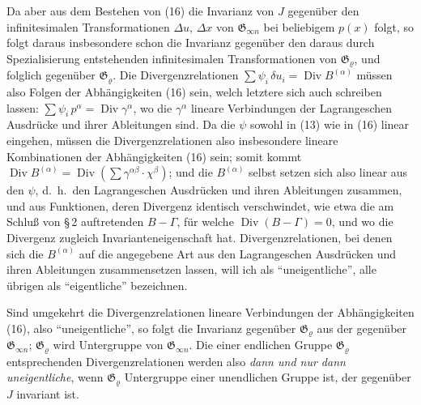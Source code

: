 \documentclass[12pt,a4paper]{article}
\begin{document}
Da aber aus dem Bestehen von (16) die Invarianz von $J$ gegen\"uber den infinitesimalen Transformationen $\Delta u$, $\Delta x$ von $\mathfrak{G}_{\infty n}$ bei beliebigem $p(x)$ folgt, so folgt daraus insbesondere schon die Invarianz gegen\"uber den daraus durch Spezialisierung entstehenden infinitesimalen Transformationen von $\mathfrak{G}_{\varrho}$, und folglich gegen\"uber $\mathfrak{G}_{\varrho}$. Die Divergenzrelationen $\sum\psi_{i}\,\delta u_{i}=\operatorname{Div}B^{(\alpha)}$ m\"ussen also Folgen der Abh\"angigkeiten (16) sein, welch letztere sich auch schreiben lassen: $\sum\psi_{i}\,p^{\alpha}=\operatorname{Div}\gamma^{\alpha}$, wo die $\gamma^{\alpha}$ lineare Verbindungen der Lagrangeschen Ausdr\"ucke und ihrer Ableitungen sind. Da die $\psi$ sowohl in (13) wie in (16) linear eingehen, m\"ussen die Divergenzrelationen also insbesondere lineare Kombinationen der Abh\"angigkeiten (16) sein; somit kommt $\operatorname{Div}B^{(\alpha)}=\operatorname{Div}(\sum\gamma^{\alpha\beta}\cdot\chi^{\beta})$; und die $B^{(\alpha)}$ selbst setzen sich also linear aus den $\psi$, d.\ h.\ den Lagrangeschen Ausdr\"ucken und ihren Ableitungen zusammen, und aus Funktionen, deren Divergenz identisch verschwindet, wie etwa die am Schlu\ss{} von \S\,2 auftretenden $B-\varGamma$, f\"ur welche $\operatorname{Div}(B-\varGamma)=0$, und wo die Divergenz zugleich Invarianteneigenschaft hat. Divergenzrelationen, bei denen sich die $B^{(\alpha)}$ auf die angegebene Art aus den Lagrangeschen Ausdr\"ucken und ihren Ableitungen zusammensetzen lassen, will ich als ``uneigentliche'', alle \"ubrigen als ``eigentliche'' bezeichnen.

Sind umgekehrt die Divergenzrelationen lineare Verbindungen der Abh\"angigkeiten (16), also ``uneigentliche'', so folgt die Invarianz gegen\"uber $\mathfrak{G}_{\varrho}$ aus der gegen\"uber $\mathfrak{G}_{\infty n}$; $\mathfrak{G}_{\varrho}$ wird Untergruppe von $\mathfrak{G}_{\infty n}$. Die einer endlichen Gruppe $\mathfrak{G}_{\varrho}$ entsprechenden Divergenzrelationen werden also \emph{dann und nur dann uneigentliche}, wenn $\mathfrak{G}_{\varrho}$ Untergruppe einer unendlichen Gruppe ist, der gegen\"uber $J$ invariant ist.
\end{document}
